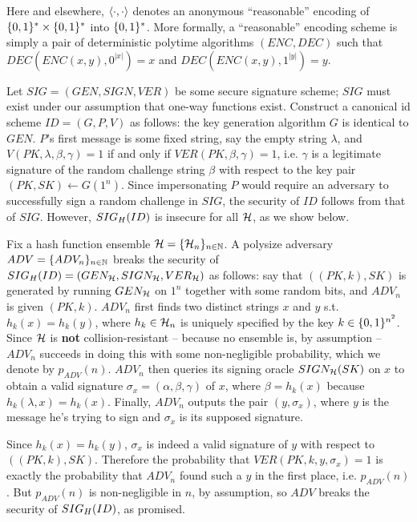 \documentclass[12pt,twoside]{article}
\begin{document}
\noindent
Here and elsewhere, $\enc{\cdot,\cdot}$ denotes an anonymous ``reasonable'' 
encoding of $\strs{*}\times \strs{*}$ into $\strs{*}$. More formally, a
``reasonable'' encoding scheme is simply a pair of deterministic polytime 
algorithms $(ENC,DEC)$ such that $DEC(ENC(x,y),0^{|x|}) = x$ and 
$DEC(ENC(x,y),1^{|y|}) = y$.

Let $SIG = (GEN,SIGN,VER)$ be some secure signature scheme; $SIG$ must exist 
under our assumption that one-way functions exist. Construct a canonical id 
scheme $ID = (G,P,V)$ as follows: the key generation algorithm
$G$ is identical to $GEN$. $P$'s first message is some fixed string, say the 
empty string $\lambda$, and $V(PK,\lambda,\beta,\gamma) = 1$ if and only if
$VER(PK,\beta,\gamma) = 1$, i.e. $\gamma$ is a legitimate signature of the
random challenge string $\beta$ with respect to the key pair $(PK,SK) \gets
G(1^n)$. Since impersonating $P$ would require an adversary to successfully 
sign a random challenge in $SIG$, the security of $ID$ follows from that of 
$SIG$. However, $\fs{ID}{H}$ is insecure for all $\fanh$, as we show below. 

Fix a hash function ensemble $\fanh = \ens{\fanh}{n}$. A polysize 
adversary $ADV = \{ADV_n\}_{n \in \nats}$ breaks the security of 
$\fs{ID}{H} = (GEN_\fanh, SIGN_\fanh, VER_\fanh)$ as follows: say that 
$((PK,k),SK)$ is generated by running $GEN_\fanh$ on $1^n$ together with some 
random bits, and $ADV_n$ is given $(PK,k)$. $ADV_n$ first finds two distinct 
strings $x$ and $y$ s.t. $h_k(x) = h_k(y)$, where $h_k \in \fanh_n$ is
uniquely specified by the key $k \in \strs{n^2}$. Since $\fanh$ is {\bf not} 
collision-resistant -- because no ensemble is, by assumption -- $ADV_n$ succeeds
in doing this with some non-negligible probability, which we denote by 
$p_{ADV}(n)$. $ADV_n$ then queries its signing oracle $SIGN_\fanh(SK)$ on $x$ 
to obtain a valid signature $\sigma_x = (\alpha, \beta,\gamma)$ of $x$, where
$\beta = h_k(x)$ because $h_k(\lambda,x) = h_k(x)$. Finally, $ADV_n$ outputs 
the pair $(y,\sigma_x)$, where $y$ is the message he's trying to sign and
$\sigma_x$ is its supposed signature. 

Since $h_k(x) = h_k(y)$, $\sigma_x$ is indeed a valid signature of
$y$ with respect to $((PK,k),SK)$. Therefore the probability that 
$VER(PK,k,y,\sigma_x) = 1$ is exactly the probability that $ADV_n$ found such 
a $y$ in the first place, i.e. $p_{ADV}(n)$. But $p_{ADV}(n)$ is 
non-negligible in $n$, by assumption, so $ADV$ breaks the security of 
$\fs{ID}{H}$, as promised.
\end{document}
